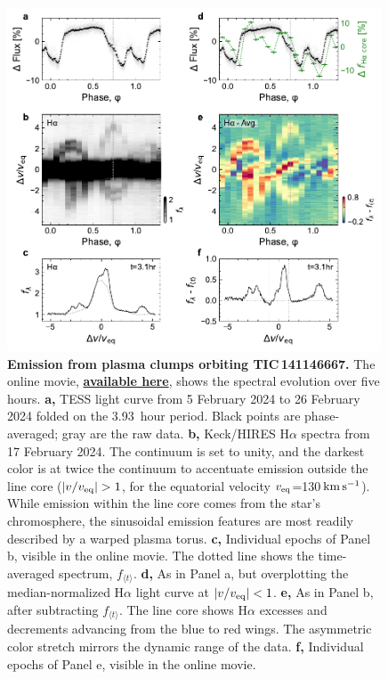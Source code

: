 \documentclass[11pt,twocolumn,tighten]{aastex7}
\newcommand{\kms}{\ensuremath{\rm km\,s^{-1}}}
\begin{document}
\begin{figure}[!t]
  \centering
  \includegraphics[width=0.99\textwidth]{f3.pdf}
  \vspace{-0.3cm}
  \captionsetup{labelformat=moviefmt,labelsep=colon}
	\caption{\textbf{Emission from plasma clumps orbiting
TIC\,141146667.}
  The online movie,
  \href{https://lgbouma.com/movies/TIC141146667_sixpanel.mp4}{{\bf
  available here}},
  shows the spectral evolution over five hours.
  {\bf a,} TESS light curve from 5 February 2024 to 26
  February 2024 folded on the 3.93\ hour period.  Black
  points are phase-averaged; gray are the raw data.
  {\bf b,} Keck/HIRES H$\alpha$ spectra from 17 February 2024.
  The continuum is set to unity, and the darkest color is at twice the
  continuum to accentuate emission outside the line core ($|v/v_{\rm
  eq}|>1$, for the equatorial velocity $v_{\rm eq}$=130\,\kms).  While
  emission within the line core comes from the star's chromosphere, the
  sinusoidal emission features are most readily described by a warped
  plasma torus.
  {\bf c,} Individual epochs of Panel b, visible in the online movie.
  The dotted line shows the time-averaged spectrum, $f_{\langle t
  \rangle}$.
  {\bf d,} As in Panel a, but overplotting the
  median-normalized H$\alpha$ light curve at $|v/v_{\rm eq}|<1$.
  {\bf e,} As in Panel b, after subtracting $f_{\langle t
  \rangle}$.  The line core shows H$\alpha$ excesses and decrements
  advancing from the blue to red wings.
  The asymmetric color stretch mirrors the dynamic range of the data.
  {\bf f,} Individual epochs of Panel e, visible in the online
  movie.  }
  \label{fig:spec}
\end{figure}
\end{document}
